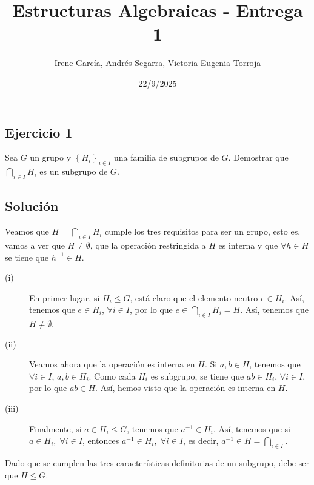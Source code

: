 \documentclass{article}
\begin{document}
\title{Estructuras Algebraicas - Entrega 1}
\author{Irene García, Andrés Segarra, Victoria Eugenia Torroja}
\date{22/9/2025}

\maketitle
\subsection*{Ejercicio 1}

	Sea $\displaystyle G $ un grupo y $\displaystyle \left\{ H_{i}\right\} _{i \in I} $ una familia de subgrupos de $\displaystyle G $. Demostrar que $ \bigcap_{i \in I}H_{i} $ es un subgrupo de $\displaystyle G $.  
\subsection*{Solución}

Veamos que $ H = \bigcap_{i \in I} H_{i} $ cumple los tres requisitos para ser un grupo, esto es, vamos a ver que $\displaystyle H \neq \emptyset $, que la operación restringida a $\displaystyle H $ es interna y que $\displaystyle \forall h \in H $ se tiene que $\displaystyle h^{-1} \in H $. 
\begin{description}
\item[(i)] En primer lugar, si $\displaystyle H_{i} \leq G $, está claro que el elemento neutro $\displaystyle e \in H_{i} $. Así, tenemos que $\displaystyle e \in H_{i} $, $\displaystyle \forall i \in I $, por lo que $ e \in \bigcap_{i \in I}H_{i} = H $. Así, tenemos que $\displaystyle H \neq \emptyset $.
\item[(ii)] Veamos ahora que la operación es interna en $\displaystyle H $. Si $\displaystyle a,b \in H $, tenemos que $\displaystyle \forall i \in I $, $\displaystyle a,b \in H_{i} $. Como cada $\displaystyle H_{i} $ es subgrupo, se tiene que $\displaystyle ab \in H_{i} $, $\displaystyle \forall i \in I $, por lo que $\displaystyle ab \in H $. Así, hemos visto que la operación es interna en $\displaystyle H $.
\item[(iii)] Finalmente, si $\displaystyle a \in H_{i} \leq G $, tenemos que $\displaystyle a^{-1} \in H_{i} $. Así, tenemos que si $\displaystyle a\in H_{i}, \; \forall i \in I $, entonces $\displaystyle a^{-1} \in H_{i}, \; \forall i \in I $, es decir, $ a^{-1} \in H = \bigcap_{ i \in I} $.
\end{description}
Dado que se cumplen las tres características definitorias de un subgrupo, debe ser que $\displaystyle H \leq G $.
\end{document}
